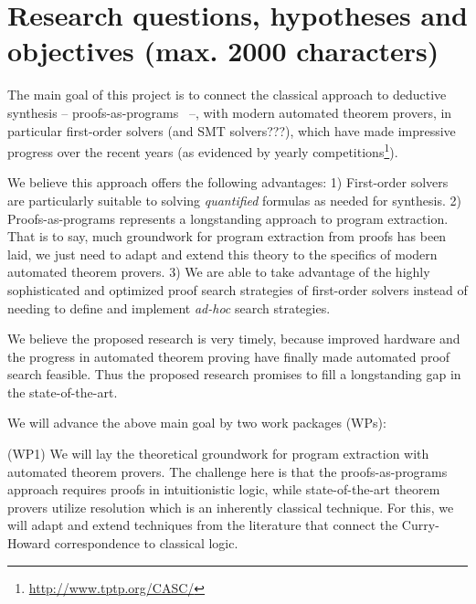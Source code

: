 \documentclass[a4paper,12pt]{article}
\begin{document}
\section{Research questions, hypotheses and objectives (max. 2000 characters)}

The main goal of this project is to connect the classical approach to deductive synthesis --  proofs-as-programs~\cite{girard1989proofs} --, with modern automated theorem provers, in particular first-order solvers (and SMT solvers???), which have made impressive progress over the recent years (as evidenced by yearly competitions\footnote{\url{http://www.tptp.org/CASC/}}).

We believe this approach offers the following advantages:
1) First-order solvers are particularly suitable to solving \emph{quantified} formulas as needed for synthesis.
2) Proofs-as-programs represents a longstanding approach to program extraction.
That is to say, much groundwork for program extraction from proofs has been laid, we just need to adapt and extend this theory to the specifics of modern automated theorem provers.
3) We are able to take advantage of the highly sophisticated and optimized proof search strategies of first-order solvers instead of needing to define and implement \emph{ad-hoc} search strategies.

We believe the proposed research is very timely, because improved hardware and the progress in automated theorem proving have finally made automated proof search feasible.
Thus the proposed research promises to fill a longstanding gap in the state-of-the-art.

We will advance the above main goal by two work packages (WPs):

(WP1) We will lay the theoretical groundwork for program extraction with automated theorem provers.
The challenge here is that the proofs-as-programs approach requires proofs in intuitionistic logic, while state-of-the-art theorem provers
utilize resolution which is an inherently classical technique.
For this, we will adapt and extend techniques from the literature that connect the Curry-Howard correspondence to classical logic.
\end{document}
